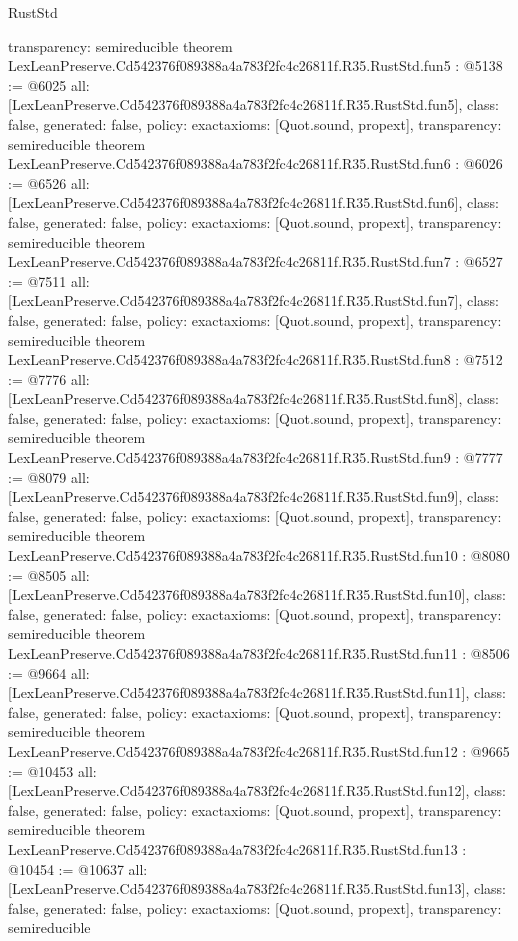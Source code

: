 \begin{lexlean}{RustStd}
\begin{coremodule}
{  transparency: semireducible
}
theorem LexLeanPreserve.Cd542376f089388a4a783f2fc4c26811f.R35.RustStd.fun5 : @5138 := @6025 {
  all: [LexLeanPreserve.Cd542376f089388a4a783f2fc4c26811f.R35.RustStd.fun5],
  class: false,
  generated: false,
  policy: exact{axioms: [Quot.sound, propext]},
  transparency: semireducible
}
theorem LexLeanPreserve.Cd542376f089388a4a783f2fc4c26811f.R35.RustStd.fun6 : @6026 := @6526 {
  all: [LexLeanPreserve.Cd542376f089388a4a783f2fc4c26811f.R35.RustStd.fun6],
  class: false,
  generated: false,
  policy: exact{axioms: [Quot.sound, propext]},
  transparency: semireducible
}
theorem LexLeanPreserve.Cd542376f089388a4a783f2fc4c26811f.R35.RustStd.fun7 : @6527 := @7511 {
  all: [LexLeanPreserve.Cd542376f089388a4a783f2fc4c26811f.R35.RustStd.fun7],
  class: false,
  generated: false,
  policy: exact{axioms: [Quot.sound, propext]},
  transparency: semireducible
}
theorem LexLeanPreserve.Cd542376f089388a4a783f2fc4c26811f.R35.RustStd.fun8 : @7512 := @7776 {
  all: [LexLeanPreserve.Cd542376f089388a4a783f2fc4c26811f.R35.RustStd.fun8],
  class: false,
  generated: false,
  policy: exact{axioms: [Quot.sound, propext]},
  transparency: semireducible
}
theorem LexLeanPreserve.Cd542376f089388a4a783f2fc4c26811f.R35.RustStd.fun9 : @7777 := @8079 {
  all: [LexLeanPreserve.Cd542376f089388a4a783f2fc4c26811f.R35.RustStd.fun9],
  class: false,
  generated: false,
  policy: exact{axioms: [Quot.sound, propext]},
  transparency: semireducible
}
theorem LexLeanPreserve.Cd542376f089388a4a783f2fc4c26811f.R35.RustStd.fun10 : @8080 := @8505 {
  all: [LexLeanPreserve.Cd542376f089388a4a783f2fc4c26811f.R35.RustStd.fun10],
  class: false,
  generated: false,
  policy: exact{axioms: [Quot.sound, propext]},
  transparency: semireducible
}
theorem LexLeanPreserve.Cd542376f089388a4a783f2fc4c26811f.R35.RustStd.fun11 : @8506 := @9664 {
  all: [LexLeanPreserve.Cd542376f089388a4a783f2fc4c26811f.R35.RustStd.fun11],
  class: false,
  generated: false,
  policy: exact{axioms: [Quot.sound, propext]},
  transparency: semireducible
}
theorem LexLeanPreserve.Cd542376f089388a4a783f2fc4c26811f.R35.RustStd.fun12 : @9665 := @10453 {
  all: [LexLeanPreserve.Cd542376f089388a4a783f2fc4c26811f.R35.RustStd.fun12],
  class: false,
  generated: false,
  policy: exact{axioms: [Quot.sound, propext]},
  transparency: semireducible
}
theorem LexLeanPreserve.Cd542376f089388a4a783f2fc4c26811f.R35.RustStd.fun13 : @10454 := @10637 {
  all: [LexLeanPreserve.Cd542376f089388a4a783f2fc4c26811f.R35.RustStd.fun13],
  class: false,
  generated: false,
  policy: exact{axioms: [Quot.sound, propext]},
  transparency: semireducible
}
\end{coremodule}
\end{lexlean}

